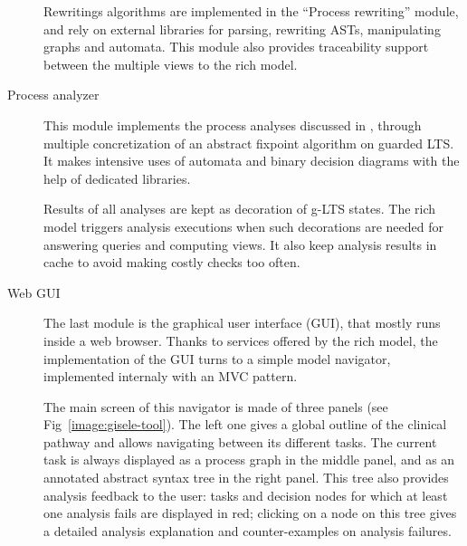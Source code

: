 \begin{description}
Rewritings algorithms are implemented in the ``Process rewriting'' module, and rely on external libraries for parsing, rewriting ASTs, manipulating graphs and automata. This module also provides traceability support between the multiple views to the rich model.

\item[Process analyzer] This module implements the process analyses discussed in \cite{Damas:2011}, through multiple concretization of an abstract fixpoint algorithm on guarded LTS. It makes intensive uses of automata and binary decision diagrams with the help of dedicated libraries. 

Results of all analyses are kept as decoration of g-LTS states. The rich model triggers analysis executions when such decorations are needed for answering queries and computing views. It also keep analysis results in cache to avoid making costly checks too often.

\item[Web GUI] The last module is the graphical user interface (GUI), that mostly runs inside a web browser. Thanks to services offered by the rich model, the implementation of the GUI turns to a simple model navigator, implemented internaly with an MVC pattern. 

The main screen of this navigator is made of three panels (see Fig~\ref{image:gisele-tool}). The left one gives a global outline of the clinical pathway and allows navigating between its different tasks. The current task is always displayed as a process graph in the middle panel, and as an annotated abstract syntax tree in the right panel. This tree also provides analysis feedback to the user: tasks and decision nodes for which at least one analysis fails are displayed in red; clicking on a node on this tree gives a detailed analysis explanation and counter-examples on analysis failures.

\end{description}


